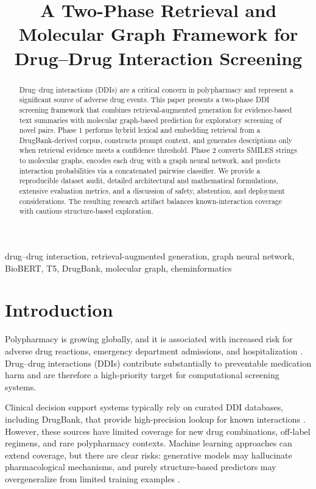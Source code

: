 \documentclass[conference]{IEEEtran}
\title{A Two-Phase Retrieval and Molecular Graph Framework for Drug--Drug Interaction Screening}
\author{%
    \IEEEauthorblockN{Author Name(s) Omitted for Review}
    \IEEEauthorblockA{Department/Institution Omitted for Review\\
    \texttt{email@example.com}}
}
\begin{document}
\maketitle

\begin{abstract}
Drug--drug interactions (DDIs) are a critical concern in polypharmacy and represent a significant source of adverse drug events. This paper presents a two-phase DDI screening framework that combines retrieval-augmented generation for evidence-based text summaries with molecular graph-based prediction for exploratory screening of novel pairs. Phase 1 performs hybrid lexical and embedding retrieval from a DrugBank-derived corpus, constructs prompt context, and generates descriptions only when retrieval evidence meets a confidence threshold. Phase 2 converts SMILES strings to molecular graphs, encodes each drug with a graph neural network, and predicts interaction probabilities via a concatenated pairwise classifier. We provide a reproducible dataset audit, detailed architectural and mathematical formulations, extensive evaluation metrics, and a discussion of safety, abstention, and deployment considerations. The resulting research artifact balances known-interaction coverage with cautious structure-based exploration.
\end{abstract}

\begin{IEEEkeywords}
drug--drug interaction, retrieval-augmented generation, graph neural network, BioBERT, T5, DrugBank, molecular graph, cheminformatics
\end{IEEEkeywords}

\section{Introduction}
Polypharmacy is growing globally, and it is associated with increased risk for adverse drug reactions, emergency department admissions, and hospitalization \cite{hoppe2019polypharmacy, laroche2014polypharmacy, johnson2015drug}. Drug--drug interactions (DDIs) contribute substantially to preventable medication harm and are therefore a high-priority target for computational screening systems.

Clinical decision support systems typically rely on curated DDI databases, including DrugBank, that provide high-precision lookup for known interactions \cite{wishart2018drugbank}. However, these sources have limited coverage for new drug combinations, off-label regimens, and rare polypharmacy contexts. Machine learning approaches can extend coverage, but there are clear risks: generative models may hallucinate pharmacological mechanisms, and purely structure-based predictors may overgeneralize from limited training examples \cite{ji2023survey, hendrycks2019benchmarking}.
\end{document}
